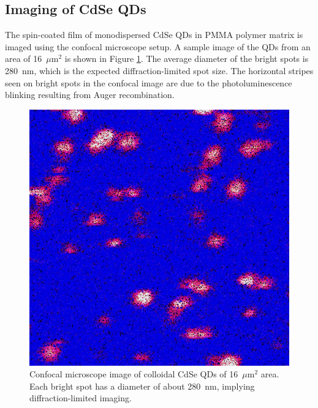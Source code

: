 \documentclass[%
 aip,
 amsmath,amssymb,
 reprint,%
]{revtex4-1}
\begin{document}
\subsection{\textbf{Imaging of CdSe QDs}}
The spin-coated film of monodispersed CdSe QDs in PMMA polymer matrix is imaged using the confocal microscope setup. A sample image of the QDs from an area of 16~$\mu$m$^2$ is shown in Figure \ref{fig:single frame}. The average diameter of the bright spots is 280~nm, which is the expected diffraction-limited spot size. The horizontal stripes seen on bright spots in the confocal image are due to the photoluminescence blinking \cite{II} resulting from Auger recombination.
\begin{figure}
    \centering
    \includegraphics[width=0.7\linewidth]{single frame.jpg}
    \caption{Confocal microscope image of colloidal CdSe QDs of 16~$\mu$m$^2$ area. Each bright spot has a diameter of about 280~nm, implying diffraction-limited imaging.}
    \label{fig:single frame}
\end{figure}
\end{document}
